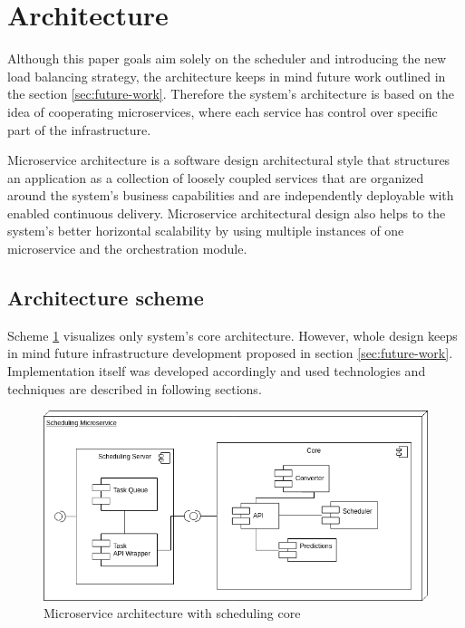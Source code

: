 \section{Architecture}\label{sec:architecture}

Although this paper goals aim solely on the scheduler and introducing the new load balancing strategy,
the architecture keeps in mind future work outlined in the section \ref{sec:future-work}.
Therefore the system's architecture is based on the idea of cooperating microservices,
where each service has control over specific part of the infrastructure. 

Microservice architecture is a software design architectural style 
that structures an application as a collection of loosely coupled services that 
are organized around the system's business capabilities\cite{namiot2014micro} 
and are independently deployable with enabled continuous delivery\cite{balalaie2016microservices}.
Microservice architectural design also helps to the system's better horizontal scalability
by using multiple instances of one microservice 
and the orchestration module.

\subsection{Architecture scheme}\label{subsec:architecture-scheme}
Scheme \ref{fig:scheduling-core-arch} visualizes only system's core architecture. 
However,
whole design keeps in mind future infrastructure development proposed in section \ref{sec:future-work}.
Implementation itself was developed accordingly 
and used technologies and techniques are described in following sections.

\begin{figure}[ht]
    \includegraphics[width=\textwidth]{i_scheduler.png} 
    \centering
    \caption{Microservice architecture with scheduling core}
    \label{fig:scheduling-core-arch}
\end{figure}

